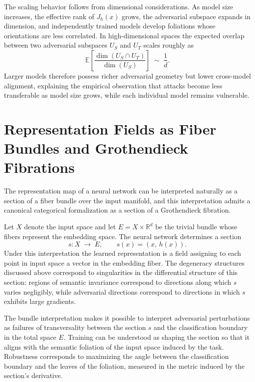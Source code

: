 \documentclass[12pt,a4paper]{article}
\theoremstyle{plain}
\theoremstyle{definition}
\begin{document}
The scaling behavior follows from dimensional considerations. As model size
increases, the effective rank of $J_h(x)$ grows, the adversarial subspace
expands in dimension, and independently trained models develop foliations whose
orientations are less correlated. In high-dimensional spaces the expected
overlap between two adversarial subspaces $U_S$ and $U_T$ scales roughly as
\[
\mathbb{E}\!\left[\frac{\dim(U_S \cap U_T)}{\dim(U_S)}\right] \;\sim\; \frac{1}{d}.
\]
Larger models therefore possess richer adversarial geometry but lower
cross-model alignment, explaining the empirical observation that attacks become
less transferable as model size grows, while each individual model remains
vulnerable.

\section{Representation Fields as Fiber Bundles and Grothendieck Fibrations}
\label{sec:bundles}

The representation map of a neural network can be interpreted naturally as a
section of a fiber bundle over the input manifold, and this interpretation
admits a canonical categorical formalization as a section of a Grothendieck
fibration.

Let $X$ denote the input space and let $E = X \times \mathbb{R}^d$ be the
trivial bundle whose fibers represent the embedding space. The neural network
determines a section
\[
s : X \;\longrightarrow\; E, \qquad s(x) = (x,\, h(x)).
\]
Under this interpretation the learned representation is a field assigning to
each point in input space a vector in the embedding fiber. The degeneracy
structures discussed above correspond to singularities in the differential
structure of this section: regions of semantic invariance correspond to
directions along which $s$ varies negligibly, while adversarial directions
correspond to directions in which $s$ exhibits large gradients.

The bundle interpretation makes it possible to interpret adversarial
perturbations as failures of transversality between the section $s$ and the
classification boundary in the total space $E$. Training can be understood as
shaping the section so that it aligns with the semantic foliation of the input
space induced by the task. Robustness corresponds to maximizing the angle
between the classification boundary and the leaves of the foliation, measured
in the metric induced by the section's derivative.
\end{document}
